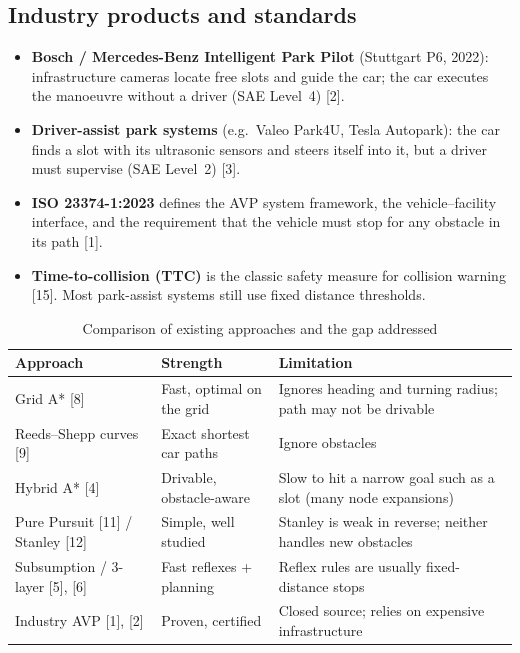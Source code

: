 \documentclass[12pt,a4paper]{article}
\begin{document}
\subsection{Industry products and standards}
\begin{itemize}[itemsep=0pt,topsep=2pt]
\item \textbf{Bosch / Mercedes-Benz Intelligent Park Pilot} (Stuttgart P6, 2022): infrastructure cameras locate free slots and guide the car; the car executes the manoeuvre without a driver (SAE Level~4) [2].
\item \textbf{Driver-assist park systems} (e.g.\ Valeo Park4U, Tesla Autopark): the car finds a slot with its ultrasonic sensors and steers itself into it, but a driver must supervise (SAE Level~2) [3].
\item \textbf{ISO 23374-1:2023} defines the AVP system framework, the vehicle--facility interface, and the requirement that the vehicle must stop for any obstacle in its path [1].
\item \textbf{Time-to-collision (TTC)} is the classic safety measure for collision warning [15]. Most park-assist systems still use fixed distance thresholds.
\end{itemize}

\begin{table}[!htbp]
\centering
\caption{Comparison of existing approaches and the gap addressed}
\label{tab:lit}
\renewcommand{\arraystretch}{1.25}
\begin{tabular}{|P{3.5cm}|P{4.6cm}|P{5.2cm}|}
\hline
\textbf{Approach} & \textbf{Strength} & \textbf{Limitation} \\ \hline
Grid A* [8] & Fast, optimal on the grid & Ignores heading and turning radius; path may not be drivable \\ \hline
Reeds--Shepp curves [9] & Exact shortest car paths & Ignore obstacles \\ \hline
Hybrid A* [4] & Drivable, obstacle-aware & Slow to hit a narrow goal such as a slot (many node expansions) \\ \hline
Pure Pursuit [11] / Stanley [12] & Simple, well studied & Stanley is weak in reverse; neither handles new obstacles \\ \hline
Subsumption / 3-layer [5], [6] & Fast reflexes + planning & Reflex rules are usually fixed-distance stops \\ \hline
Industry AVP [1], [2] & Proven, certified & Closed source; relies on expensive infrastructure \\ \hline
\end{tabular}
\end{table}
\end{document}
